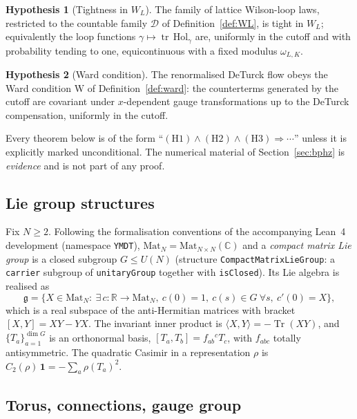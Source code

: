 \documentclass[11pt,a4paper]{article}
\theoremstyle{definition}
\newtheorem{hypothesis}{Hypothesis}
\theoremstyle{remark}
\newcommand{\R}{\mathbb{R}}
\newcommand{\g}{\mathfrak{g}}
\newcommand{\Tr}{\operatorname{Tr}}
\newcommand{\tr}{\operatorname{tr}}
\begin{document}
\begin{hypothesis}[Tightness in $W_L$]\label{h:H2}
The family of lattice Wilson-loop laws, restricted to the countable family $\mathcal D$ of Definition~\ref{def:WL}, is tight in $W_L$; equivalently the loop functions $\gamma\mapsto \tr\,\mathrm{Hol}_\gamma$ are, uniformly in the cutoff and with probability tending to one, equicontinuous with a fixed modulus $\omega_{L,K}$.
\end{hypothesis}

\begin{hypothesis}[Ward condition]\label{h:H3}
The renormalised DeTurck flow obeys the Ward condition $\mathrm W$ of Definition~\ref{def:ward}: the counterterms generated by the cutoff are covariant under $x$-dependent gauge transformations up to the DeTurck compensation, uniformly in the cutoff.
\end{hypothesis}

Every theorem below is of the form ``$\mathrm{(H1)}\wedge\mathrm{(H2)}\wedge\mathrm{(H3)}\Rightarrow\cdots$'' unless it is explicitly marked unconditional. The numerical material of Section~\ref{sec:bphz} is \emph{evidence} and is not part of any proof.

\subsection{Lie group structures}

Fix $N\ge 2$. Following the formalisation conventions of the accompanying Lean~4 development (namespace \texttt{YMDT}), $\mathrm{Mat}_N=\mathrm{Mat}_{N\times N}(\mathbb C)$ and a \emph{compact matrix Lie group} is a closed subgroup $G\le U(N)$ (structure \texttt{CompactMatrixLieGroup}: a \texttt{carrier} subgroup of \texttt{unitaryGroup} together with \texttt{isClosed}). Its Lie algebra is realised as
\begin{equation}
\g=\{X\in \mathrm{Mat}_N:\ \exists\, c:\R\to\mathrm{Mat}_N,\ c(0)=1,\ c(s)\in G\ \forall s,\ c'(0)=X\},
\end{equation}
which is a real subspace of the anti-Hermitian matrices with bracket $[X,Y]=XY-YX$. The invariant inner product is $\langle X,Y\rangle=-\Tr(XY)$, and $\{T_a\}_{a=1}^{\dim G}$ is an orthonormal basis, $[T_a,T_b]=f_{ab}{}^{c}T_c$, with $f_{abc}$ totally antisymmetric. The quadratic Casimir in a representation $\rho$ is $C_2(\rho)\,\mathbf 1=-\sum_a\rho(T_a)^2$.

\subsection{Torus, connections, gauge group}
\end{document}
